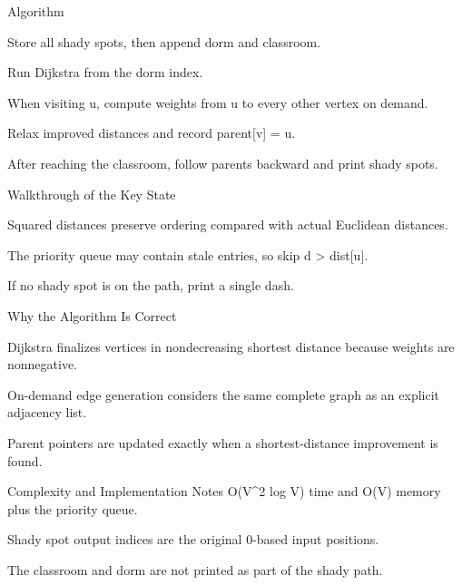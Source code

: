 \documentclass[aspectratio=169,11pt]{beamer}
\begin{document}
\begin{frame}{Algorithm}
\begin{tightitemize}
  \item Store all shady spots, then append dorm and classroom.
  \item Run Dijkstra from the dorm index.
  \item When visiting u, compute weights from u to every other vertex on demand.
  \item Relax improved distances and record parent[v] = u.
  \item After reaching the classroom, follow parents backward and print shady spots.
\end{tightitemize}
\end{frame}

\begin{frame}{Walkthrough of the Key State}
\begin{tightitemize}
  \item Squared distances preserve ordering compared with actual Euclidean distances.
  \item The priority queue may contain stale entries, so skip d > dist[u].
  \item If no shady spot is on the path, print a single dash.
\end{tightitemize}
\end{frame}

\begin{frame}{Why the Algorithm Is Correct}
\begin{tightitemize}
  \item Dijkstra finalizes vertices in nondecreasing shortest distance because weights are nonnegative.
  \item On-demand edge generation considers the same complete graph as an explicit adjacency list.
  \item Parent pointers are updated exactly when a shortest-distance improvement is found.
\end{tightitemize}
\end{frame}

\begin{frame}{Complexity and Implementation Notes}
\small
{} O(V\textasciicircum{}2 log V) time and O(V) memory plus the priority queue.

\vspace{0.3cm}
\begin{tightitemize}
  \item Shady spot output indices are the original 0-based input positions.
  \item The classroom and dorm are not printed as part of the shady path.
\end{tightitemize}
\end{frame}
\end{document}
